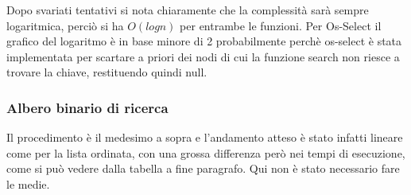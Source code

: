     Dopo svariati tentativi si nota chiaramente che la complessità sarà sempre logaritmica, perciò si ha $O(log n)$ per entrambe le funzioni.
    Per Os-Select il grafico del logaritmo è in base minore di 2 probabilmente perchè os-select è stata implementata per scartare a priori dei nodi di cui la funzione search non riesce a trovare la chiave, restituendo quindi null.

    \subsubsection{Albero binario di ricerca}
    Il procedimento è il medesimo a sopra e l'andamento atteso è stato infatti lineare come per la lista ordinata, con una grossa differenza però nei tempi di esecuzione, come si può vedere dalla tabella a fine paragrafo. Qui non è stato necessario fare le medie.

